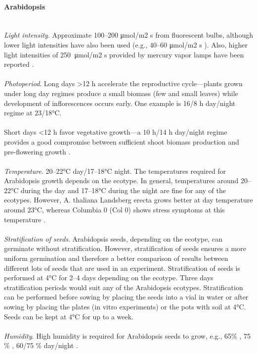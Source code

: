 \paragraph{Arabidopsis} \mbox{}  \\
\textit{Light intensity}. Approximate 100–200 μmol/m2 s from fluorescent bulbs, although lower light intensities have also been used (e.g., 40–60 μmol/m2 s \parencite{Podar2012}). Also, higher light intensities of 250  μmol/m2 s provided by mercury vapor lamps have been reported \parencite{Arrivault2006}. \\ \\
\textit{Photoperiod}. Long days >12 h accelerate the reproductive cycle—plants grown under long day regimes produce a small biomass (few and small leaves) while development of inflorescences occurs early. One example is 16/8 h day/night regime at 23/18°C.\\ \\
Short days <12 h favor vegetative growth—a 10 h/14 h day/night regime provides a good compromise between sufficient shoot biomass production and pre-flowering growth \parencite{Gibeaut1997}. \\ \\
\textit{Temperature}. 20–22°C day/17–18°C night. The temperatures required for Arabidopsis growth depends on the ecotype. In general, temperatures around 20–22°C during the day and 17–18°C during the night are fine for any of the ecotypes. However, A. thaliana Landsberg erecta grows better at day temperature around 23°C, whereas Columbia 0 (Col 0) shows stress symptoms at this temperature \parencite{Gibeaut1997}. \\ \\
\textit{Stratification of seeds}. Arabidopsis seeds, depending on the ecotype, can germinate without stratification. However, stratification of seeds ensures a more uniform germination and therefore a better comparison of results between different lots of seeds that are used in an experiment. Stratification of seeds is performed at 4°C for 2–4 days depending on the ecotype. Three days stratification periods would suit any of the Arabidopsis ecotypes. Stratification can be performed before sowing by placing the seeds into a vial in water or after sowing by placing the plates (in vitro experiments) or the pots with soil at 4°C. Seeds can be kept at 4°C for up to a week.\\ \\
\textit{Humidity}. High humidity is required for Arabidopsis seeds to grow, e.g., 65\% \parencite{Peiter2007}, 75 \% \parencite{Gibeaut1997}, 60/75 \% day/night \parencite{Arrivault2006}. \\ \\
